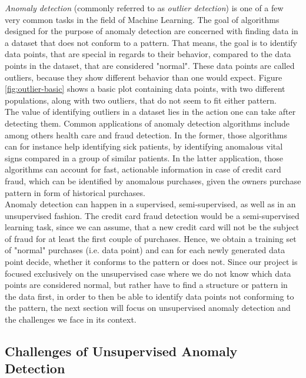 \documentclass{vldb}
\begin{document}
\textit{Anomaly detection} (commonly referred to as \textit{outlier detection}) is one of a few very common tasks in the field of Machine Learning. The goal of algorithms designed for the purpose of anomaly detection are concerned with finding data in a dataset that does not conform to a pattern. That means, the goal is to identify data points, that are special in regards to their behavior, compared to the data points in the dataset, that are considered "normal". \cite{survey:anomaly-detection} These data points are called outliers, because they show different behavior than one would expect. Figure \ref{fig:outlier-basic} shows a basic plot containing data points, with two different populations, along with two outliers, that do not seem to fit either pattern.\\
The value of identifying outliers in a dataset lies in the action one can take after detecting them. Common applications of anomaly detection algorithms include among others health care and fraud detection. In the former, those algorithms can for instance help identifying sick patients, by identifying anomalous vital signs compared in a group of similar patients. In the latter application, those algorithms can account for fast, actionable information in case of credit card fraud, which can be identified by anomalous purchases, given the owners purchase pattern in form of historical purchases. \\
Anomaly detection can happen in a supervised, semi-super\-vised, as well as in an unsupervised fashion. The credit card fraud detection would be a semi-supervised learning task, since we can assume, that a new credit card will not be the subject of fraud for at least the first couple of purchases. Hence, we obtain a training set of "normal" purchases (i.e. data point) and can for each newly generated data point decide, whether it conforms to the pattern or does not. Since our project is focused exclusively on the unsupervised case where we do not know which data points are considered normal, but rather have to find a structure or pattern in the data first, in order to then be able to identify data points not conforming to the pattern, the next section will focus on unsupervised anomaly detection and the challenges we face in its context.


\subsection{Challenges of Unsupervised Anomaly Detection}
\label{subsec:Intro-challenges}
\end{document}

